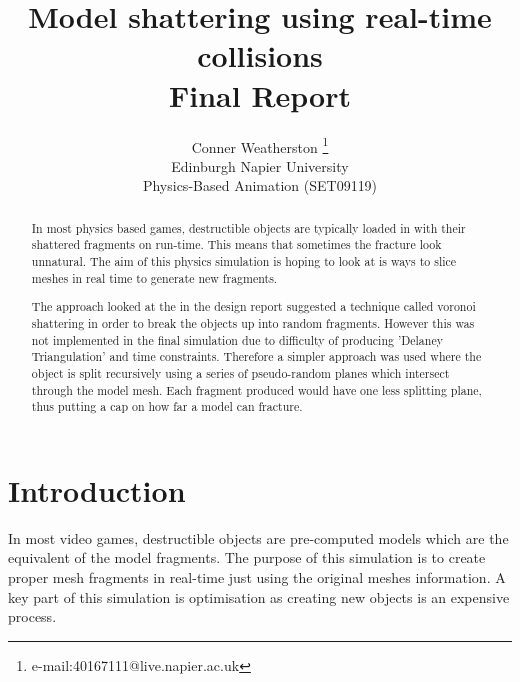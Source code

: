 \documentclass[conference,backref=page]{acmsiggraph}
\title{Model shattering using real-time collisions\\
	   Final Report}
\author{Conner Weatherston \thanks{e-mail:40167111@live.napier.ac.uk} \\
Edinburgh Napier University\\
Physics-Based Animation (SET09119)}
\begin{document}

\maketitle

\raggedbottom

\begin{abstract}
In most physics based games, destructible objects are typically loaded in with their shattered fragments on run-time. This means that sometimes the fracture look unnatural. The aim of this physics simulation is hoping to look at is ways to slice meshes in real time to generate new fragments.

The approach looked at the in the design report suggested a technique called voronoi shattering \cite{voronoi} in order to break the objects up into random fragments. However this was not implemented in the final simulation due to difficulty of producing 'Delaney Triangulation' and time constraints. Therefore a simpler approach was used where the object is split recursively using a series of pseudo-random planes which intersect through the model mesh. Each fragment produced would have one less splitting plane, thus putting a cap on how far a model can fracture.

\end{abstract}

\keywordlist

\section{Introduction}

In most video games, destructible objects are pre-computed models which are the equivalent of the model fragments. The purpose of this simulation is to create proper mesh fragments in real-time just using the original meshes information. A key part of this simulation is optimisation as creating new objects is an expensive process.
\end{document}
